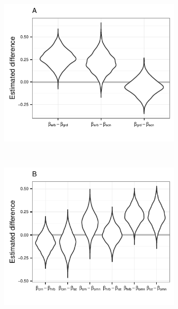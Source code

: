 \begin{figure}[ht]
  \centering
  \begin{subfigure}[b]{0.5\textwidth}
    \caption{}
    \includegraphics{chapter_death_taxa/figure/loco_diff_est}
    \label{subfig:loco}
  \end{subfigure}
  \\
  \begin{subfigure}[b]{0.5\textwidth}
    \caption{}
    \includegraphics{chapter_death_taxa/figure/diet_diff_est}
    \label{subfig:diet}
  \end{subfigure}

\end{figure}
